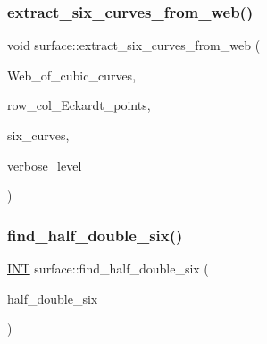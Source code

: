 \mbox{\label{classsurface_ab63c4de0ad29b4a09b27d6945faae295}} 
\subsubsection{\texorpdfstring{extract\+\_\+six\+\_\+curves\+\_\+from\+\_\+web()}{extract\_six\_curves\_from\_web()}}
{\footnotesize\ttfamily void surface\+::extract\+\_\+six\+\_\+curves\+\_\+from\+\_\+web (\begin{DoxyParamCaption}\item[{\mbox{\hyperlink{galois_8h_a09fddde158a3a20bd2dcadb609de11dc}{I\+NT}} $\ast$}]{Web\+\_\+of\+\_\+cubic\+\_\+curves,  }\item[{\mbox{\hyperlink{galois_8h_a09fddde158a3a20bd2dcadb609de11dc}{I\+NT}} $\ast$}]{row\+\_\+col\+\_\+\+Eckardt\+\_\+points,  }\item[{\mbox{\hyperlink{galois_8h_a09fddde158a3a20bd2dcadb609de11dc}{I\+NT}} $\ast$}]{six\+\_\+curves,  }\item[{\mbox{\hyperlink{galois_8h_a09fddde158a3a20bd2dcadb609de11dc}{I\+NT}}}]{verbose\+\_\+level }\end{DoxyParamCaption})}

\mbox{\label{classsurface_a7d8a3f6d14e2cc5b5dac8cf8d14f6226}} 
\subsubsection{\texorpdfstring{find\+\_\+half\+\_\+double\+\_\+six()}{find\_half\_double\_six()}}
{\footnotesize\ttfamily \mbox{\hyperlink{galois_8h_a09fddde158a3a20bd2dcadb609de11dc}{I\+NT}} surface\+::find\+\_\+half\+\_\+double\+\_\+six (\begin{DoxyParamCaption}\item[{\mbox{\hyperlink{galois_8h_a09fddde158a3a20bd2dcadb609de11dc}{I\+NT}} $\ast$}]{half\+\_\+double\+\_\+six }\end{DoxyParamCaption})}

\mbox{\label{classsurface_af88fb1ad052ac4c860b78a285f9c7b61}} 
